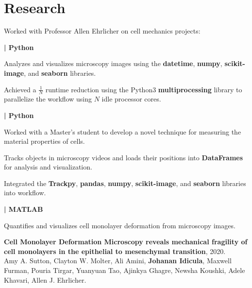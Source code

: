 \documentclass[]{jidicula-resume}
\begin{document}
\section{Research}
Worked with Professor Allen Ehrlicher on cell mechanics projects:

\textbf{| Python}
\begin{tightemize}
\item Analyzes and visualizes microscopy images using the \textbf{datetime},
  \textbf{numpy}, \textbf{scikit-image}, and \textbf{seaborn} libraries.
\item Achieved a $\frac{1}{N}$ runtime reduction using the Python3 \textbf{multiprocessing} library to parallelize the workflow using $N$ idle processor cores.
\end{tightemize}
\sectionsep{}
\textbf{| Python}
\begin{tightemize}
  
\item Worked with a Master's student to develop a novel technique for measuring the material properties of cells.

\item Tracks objects in microscopy videos and loads their
  positions into \textbf{DataFrames} for analysis and visualization.
\item Integrated the \textbf{Trackpy}, \textbf{pandas}, \textbf{numpy},
  \textbf{scikit-image}, and \textbf{seaborn} libraries into workflow.
\end{tightemize}
\sectionsep{}
\textbf{| MATLAB}
\begin{tightemize}
\item Quantifies and visualizes cell monolayer deformation from microscopy
  images.
\item \textbf{Cell Monolayer Deformation Microscopy reveals mechanical fragility of cell monolayers in the epithelial to mesenchymal transition}, 2020.\\
  Amy A. Sutton, Clayton W. Molter, Ali Amini, \textbf{Johanan Idicula},
  Maxwell Furman, Pouria Tirgar, Yuanyuan Tao, Ajinkya Ghagre, Newsha Koushki, Adele Khavari, Allen J. Ehrlicher.

\end{tightemize}
\sectionsep{}
\end{document}
